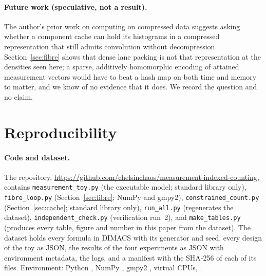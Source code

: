 \documentclass[11pt]{article}
\theoremstyle{definition}
\theoremstyle{remark}
\begin{document}
\paragraph{Future work (speculative, not a result).} The author's prior work on computing on compressed data suggests asking whether a component cache can hold its histograms in a compressed representation that still admits convolution without decompression. Section~\ref{sec:fibre} shows that dense lane packing is not that representation at the densities seen here; a sparse, additively homomorphic encoding of attained measurement vectors would have to beat a hash map on both time and memory to matter, and we know of no evidence that it does. We record the question and no claim.

\section{Reproducibility}\label{sec:repro}

\paragraph{Code and dataset.} The repository, \url{https://github.com/chelsinchaos/measurement-indexed-counting}, contains \texttt{measurement\_toy.py} (the executable model; standard library only), \texttt{fibre\_loop.py} (Section~\ref{sec:fibre}; NumPy and gmpy2), \texttt{constrained\_count.py} (Section~\ref{sec:cache}; standard library only), \texttt{run\_all.py} (regenerates the dataset), \texttt{independent\_check.py} (verification run~2), and \texttt{make\_tables.py} (produces every table, figure and number in this paper from the dataset). The dataset holds every formula in DIMACS with its generator and seed, every design of the toy as JSON, the results of the four experiments as JSON with environment metadata, the logs, and a manifest with the SHA-256 of each of its \datasetFiles{} files. Environment: Python \envPython, NumPy \envNumpy, gmpy2 \envGmpy, \envCpus{} virtual CPUs, \envPlatform.
\end{document}
